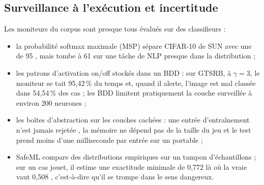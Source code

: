 \subsection{Surveillance à l'exécution et incertitude}

Les moniteurs du corpus sont presque tous évalués sur des classifieurs :
\begin{itemize}
  \item la probabilité softmax maximale (MSP)
    \citep{arxiv-1610.02136-baseline-detecting-misclassified-out-distribution} sépare
    CIFAR-10 de SUN avec une  de 95 , mais tombe à 61 sur une tâche de NLP
    presque dans la distribution  ;
  \item les patrons d'activation on/off stockés dans un BDD
    \citep{arxiv-1809.06573-runtime-monitoring-neuron-activation-patterns}\pp{} : sur
    GTSRB, à $\gamma = 3$, le moniteur se tait 95,42\,\% du temps et, quand il alerte,
    l'image est mal classée dans 54,54\,\% des cas  ; les BDD limitent
    pratiquement la couche surveillée à environ 200 neurones  ;
  \item les boîtes d'abstraction sur les couches cachées
    \citep{arxiv-1911.09032-outside-box-abstraction-monitoring-neural} : une entrée
    d'entraînement n'est jamais rejetée , la mémoire ne dépend pas de la taille
    du jeu  et le test prend moins d'une milliseconde par entrée sur un portable
     ;
  \item SafeML \citep{arxiv-2005.13166-safeml-safety-monitoring-machine-learning}\pp{}
    compare des distributions empiriques sur un tampon d'échantillons ; sur un cas jouet,
    il estime une exactitude minimale de 0,772 là où la vraie vaut 0,508 ,
    c'est-à-dire qu'il se trompe dans le sens dangereux.
\end{itemize}

